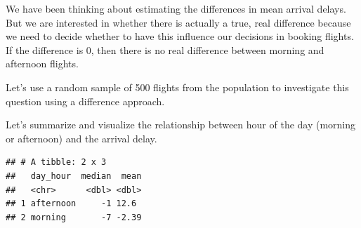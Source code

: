 \documentclass[
]{book}
\newenvironment{Shaded}{\begin{snugshade}}{\end{snugshade}}
\newcommand{\DataTypeTok}[1]{\textcolor[rgb]{0.13,0.29,0.53}{#1}}
\newcommand{\DecValTok}[1]{\textcolor[rgb]{0.00,0.00,0.81}{#1}}
\newcommand{\KeywordTok}[1]{\textcolor[rgb]{0.13,0.29,0.53}{\textbf{#1}}}
\newcommand{\NormalTok}[1]{#1}
\newcommand{\OperatorTok}[1]{\textcolor[rgb]{0.81,0.36,0.00}{\textbf{#1}}}
\newcommand{\StringTok}[1]{\textcolor[rgb]{0.31,0.60,0.02}{#1}}
\begin{document}
We have been thinking about estimating the differences in mean arrival delays. But we are interested in whether there is actually a true, real difference because we need to decide whether to have this influence our decisions in booking flights. If the difference is 0, then there is no real difference between morning and afternoon flights.

Let's use a random sample of 500 flights from the population to investigate this question using a difference approach.

\begin{Shaded}
\end{Shaded}

Let's summarize and visualize the relationship between hour of the day (morning or afternoon) and the arrival delay.

\begin{Shaded}
\end{Shaded}

\begin{verbatim}
## # A tibble: 2 x 3
##   day_hour  median  mean
##   <chr>      <dbl> <dbl>
## 1 afternoon     -1 12.6 
## 2 morning       -7 -2.39
\end{verbatim}

\begin{Shaded}
\end{Shaded}
\end{document}
